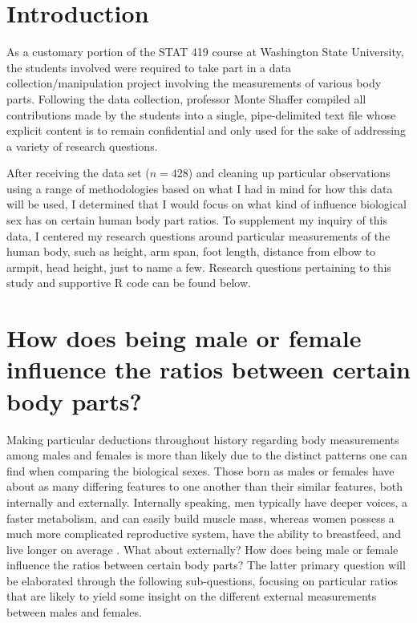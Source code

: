 \documentclass[]{article}
\begin{document}
\vskip -8.5pt




\noindent  

\section{Introduction}
\label{sec:intro}

As a customary portion of the STAT 419 course at Washington State
University, the students involved were required to take part in a data
collection/manipulation project involving the measurements of various
body parts. Following the data collection, professor Monte Shaffer
compiled all contributions made by the students into a single,
pipe-delimited text file whose explicit content is to remain
confidential and only used for the sake of addressing a variety of
research questions.

\vspace{0.25cm}

After receiving the data set (\(n=428\)) and cleaning up particular
observations using a range of methodologies based on what I had in mind
for how this data will be used, I determined that I would focus on what
kind of influence biological sex has on certain human body part ratios.
To supplement my inquiry of this data, I centered my research questions
around particular measurements of the human body, such as height, arm
span, foot length, distance from elbow to armpit, head height, just to
name a few. Research questions pertaining to this study and supportive R
code can be found below.

\section{How does being male or female influence the ratios between certain body parts?}
\label{sec:rq}

Making particular deductions throughout history regarding body
measurements among males and females is more than likely due to the
distinct patterns one can find when comparing the biological sexes.
Those born as males or females have about as many differing features to
one another than their similar features, both internally and externally.
Internally speaking, men typically have deeper voices, a faster
metabolism, and can easily build muscle mass, whereas women possess a
much more complicated reproductive system, have the ability to
breastfeed, and live longer on average \citep{Wolchover:2011}. What
about externally? How does being male or female influence the ratios
between certain body parts? The latter primary question will be
elaborated through the following sub-questions, focusing on particular
ratios that are likely to yield some insight on the different external
measurements between males and females.
\end{document}
